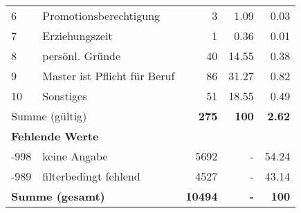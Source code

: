 \begin{longtable}{lXrrr}
     6 &
     \multicolumn{1}{X}{ Promotionsberechtigung   } &


       \num{3} &
       \num[round-mode=places,round-precision=2]{1.09} &
         \num[round-mode=places,round-precision=2]{0.03} \\

     7 &
     \multicolumn{1}{X}{ Erziehungszeit   } &


       \num{1} &
       \num[round-mode=places,round-precision=2]{0.36} &
         \num[round-mode=places,round-precision=2]{0.01} \\

     8 &
     \multicolumn{1}{X}{ persönl. Gründe   } &


       \num{40} &
       \num[round-mode=places,round-precision=2]{14.55} &
         \num[round-mode=places,round-precision=2]{0.38} \\

     9 &
     \multicolumn{1}{X}{ Master ist Pflicht für Beruf   } &


       \num{86} &
       \num[round-mode=places,round-precision=2]{31.27} &
         \num[round-mode=places,round-precision=2]{0.82} \\

     10 &
     \multicolumn{1}{X}{ Sonstiges   } &


       \num{51} &
       \num[round-mode=places,round-precision=2]{18.55} &
         \num[round-mode=places,round-precision=2]{0.49} \\
     \midrule
     \multicolumn{2}{l}{Summe (gültig)} &
       \textbf{\num{275}} &
     \textbf{\num{100}} &
       \textbf{\num[round-mode=places,round-precision=2]{2.62}} \\
     \multicolumn{5}{l}{\textbf{Fehlende Werte}}\\
       -998 &
       keine Angabe &
         \num{5692} &
        - &
         \num[round-mode=places,round-precision=2]{54.24} \\
       -989 &
       filterbedingt fehlend &
         \num{4527} &
        - &
         \num[round-mode=places,round-precision=2]{43.14} \\
     \midrule
     \multicolumn{2}{l}{\textbf{Summe (gesamt)}} &
          \textbf{\num{10494}} &
        \textbf{-} &
        \textbf{\num{100}} \\
     \bottomrule
     \end{longtable}
     
